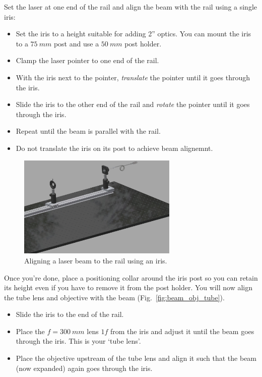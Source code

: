 \documentclass[a4paper]{report}
\begin{document}
Set the laser at one end of the rail and align the beam with the rail using a single iris:
\begin{itemize}
    \setlength\itemsep{0.1em}
    \item Set the iris to a height suitable for adding 2'' optics. You can mount the iris to a $75~mm$ post and use a $50~mm$ post holder. 
    \item Clamp the laser pointer to one end of the rail.
    \item With the iris next to the pointer, \textit{translate} the pointer until it goes through the iris. 
    \item Slide the iris to the other end of the rail and \textit{rotate} the pointer until it goes through the iris. 
    \item Repeat until the beam is parallel with the rail. 
    \item Do not translate the iris on its post to achieve beam alignemnt. 
\end{itemize} 

\begin{figure}[h]
\center
\includegraphics[width=3in]{iris_and_laser.eps}
\caption{Aligning a laser beam to the rail using an iris.}
\label{fig:beam_iris}
\end{figure}

\clearpage


Once you're done, place a positioning collar around the iris post so you can retain its height even if you have to remove it from the post holder. 
You will now align the tube lens and objective with the beam (Fig.~\ref{fig:beam_obj_tube}). 

\begin{itemize}
\item Slide the iris to the end of the rail. 
\item Place the $f=300~mm$ lens $1f$ from the iris and adjust it until the beam goes through the iris. This is your `tube lens'.
\item Place the objective upstream of the tube lens and align it such that the beam (now expanded) again goes through the iris. 
\end{itemize}
\end{document}
